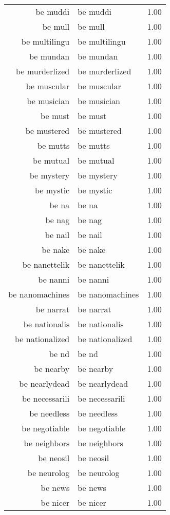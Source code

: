 \begin{table}[ht]
\begin{tabular}{rlr}
  be muddi & be muddi & 1.00 \\ 
  be mull & be mull & 1.00 \\ 
  be multilingu & be multilingu & 1.00 \\ 
  be mundan & be mundan & 1.00 \\ 
  be murderlized & be murderlized & 1.00 \\ 
  be muscular & be muscular & 1.00 \\ 
  be musician & be musician & 1.00 \\ 
  be must & be must & 1.00 \\ 
  be mustered & be mustered & 1.00 \\ 
  be mutts & be mutts & 1.00 \\ 
  be mutual & be mutual & 1.00 \\ 
  be mystery & be mystery & 1.00 \\ 
  be mystic & be mystic & 1.00 \\ 
  be na & be na & 1.00 \\ 
  be nag & be nag & 1.00 \\ 
  be nail & be nail & 1.00 \\ 
  be nake & be nake & 1.00 \\ 
  be nanettelik & be nanettelik & 1.00 \\ 
  be nanni & be nanni & 1.00 \\ 
  be nanomachines & be nanomachines & 1.00 \\ 
  be narrat & be narrat & 1.00 \\ 
  be nationalis & be nationalis & 1.00 \\ 
  be nationalized & be nationalized & 1.00 \\ 
  be nd & be nd & 1.00 \\ 
  be nearby & be nearby & 1.00 \\ 
  be nearlydead & be nearlydead & 1.00 \\ 
  be necessarili & be necessarili & 1.00 \\ 
  be needless & be needless & 1.00 \\ 
  be negotiable & be negotiable & 1.00 \\ 
  be neighbors & be neighbors & 1.00 \\ 
  be neosil & be neosil & 1.00 \\ 
  be neurolog & be neurolog & 1.00 \\ 
  be news & be news & 1.00 \\ 
  be nicer & be nicer & 1.00 \\ 

\end{tabular}
\end{table}

